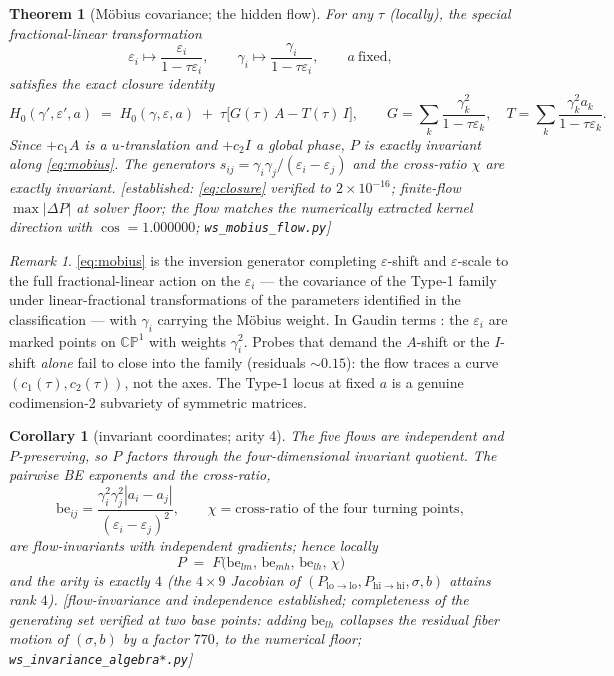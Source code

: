 \documentclass[11pt]{article}
\newtheorem{theorem}{Theorem}
\newtheorem{corollary}{Corollary}
\theoremstyle{definition}
\theoremstyle{remark}
\newtheorem{remark}{Remark}
\newcommand{\eps}{\varepsilon}
\newcommand{\C}{\mathbb{C}}
\newcommand{\be}{\mathrm{be}}
\newcommand{\lo}{\mathrm{lo}}
\newcommand{\hi}{\mathrm{hi}}
\newcommand{\evidence}[1]{\textnormal{\small[\textit{#1}]}}
\begin{document}
\begin{theorem}[M\"obius covariance; the hidden flow]\label{thm:mobius}
For any $\tau$ (locally), the special fractional-linear transformation
\begin{equation}\label{eq:mobius}
\eps_i\mapsto\frac{\eps_i}{1-\tau\eps_i},\qquad
\gamma_i\mapsto\frac{\gamma_i}{1-\tau\eps_i},\qquad a\ \text{fixed},
\end{equation}
satisfies the exact closure identity
\begin{equation}\label{eq:closure}
H_0(\gamma',\eps',a)\;=\;H_0(\gamma,\eps,a)\;+\;\tau\big[G(\tau)\,A-T(\tau)\,I\big],
\qquad
G=\textstyle\sum_k\frac{\gamma_k^2}{1-\tau\eps_k},\quad
T=\textstyle\sum_k\frac{\gamma_k^2a_k}{1-\tau\eps_k}.
\end{equation}
Since $+c_1A$ is a $u$-translation and $+c_2I$ a global phase, $P$ is exactly invariant
along \eqref{eq:mobius}. The generators $s_{ij}=\gamma_i\gamma_j/(\eps_i-\eps_j)$ and the
cross-ratio $\chi$ are exactly invariant. \evidence{established: \eqref{eq:closure}
verified to $2\times10^{-16}$; finite-flow $\max|\Delta P|$ at solver floor; the flow
matches the numerically extracted kernel direction with $\cos=1.000000$;
\texttt{ws\_mobius\_flow.py}}
\end{theorem}

\begin{remark}
\eqref{eq:mobius} is the inversion generator completing $\eps$-shift and $\eps$-scale to
the full fractional-linear action on the $\eps_i$ --- the covariance of the Type-1
family under linear-fractional transformations of the parameters identified in the
classification \cite{OWY2009,OY2011} --- with $\gamma_i$ carrying the M\"obius weight.
In Gaudin terms \cite{Y2018}: the $\eps_i$ are marked points on $\C\mathbb{P}^1$ with
weights $\gamma_i^2$. Probes that demand the $A$-shift or the $I$-shift \emph{alone}
fail to close into the family (residuals $\sim0.15$): the flow traces a curve
$(c_1(\tau),c_2(\tau))$, not the axes. The Type-1 locus at fixed $a$ is a genuine
codimension-2 subvariety of symmetric matrices.
\end{remark}

\begin{corollary}[invariant coordinates; arity 4]\label{cor:arity}
The five flows are independent and $P$-preserving, so $P$ factors through the
four-dimensional invariant quotient. The pairwise BE exponents and the cross-ratio,
\[
\be_{ij}=\frac{\gamma_i^2\gamma_j^2|a_i-a_j|}{(\eps_i-\eps_j)^2},\qquad
\chi=\text{cross-ratio of the four turning points},
\]
are flow-invariants with independent gradients; hence locally
\begin{equation}\label{eq:F4}
\boxed{\ P\;=\;F\big(\be_{lm},\,\be_{mh},\,\be_{lh},\,\chi\big)\ }
\end{equation}
and the arity is exactly $4$ (the $4{\times}9$ Jacobian of
$(P_{\lo\to\lo},P_{\hi\to\hi},\sigma,b)$ attains rank $4$).
\evidence{flow-invariance and independence established; completeness of the generating
set verified at two base points: adding $\be_{lh}$ collapses the residual fiber motion of
$(\sigma,b)$ by a factor $770$, to the numerical floor; \texttt{ws\_invariance\_algebra*.py}}
\end{corollary}
\end{document}
